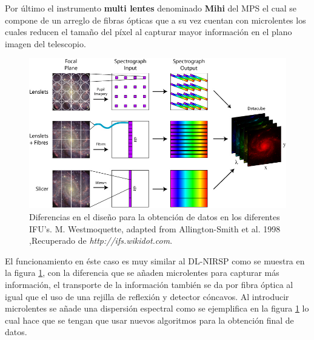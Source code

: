 Por último el instrumento \textbf{multi lentes} denominado \textbf{Mihi} del MPS el cual se compone de un arreglo de fibras ópticas que a su vez cuentan con microlentes los cuales reducen el tamaño del píxel al capturar mayor información en el plano imagen del telescopio.

\begin{figure}[H]
\centering
\includegraphics[width=0.70\linewidth]{Kap1/multilentes.jpg}
\caption{Diferencias en el diseño para la obtención de datos en los diferentes IFU's. M. Westmoquette, adapted from Allington-Smith et al. 1998 ,Recuperado de \textit{http://ifs.wikidot.com}.} 
\label{multilente}
\end{figure}

El funcionamiento en éste caso es muy similar al DL-NIRSP como se muestra en la figura \ref{multilente}, con la diferencia que se añaden microlentes para capturar más información, el transporte de la información también se da por fibra óptica al igual que el uso de una rejilla de reflexión y detector cóncavos. Al introducir microlentes se añade una dispersión espectral como se ejemplifica en la figura \ref{multilente} lo cual hace que se tengan que usar nuevos algoritmos para la obtención final de datos.




